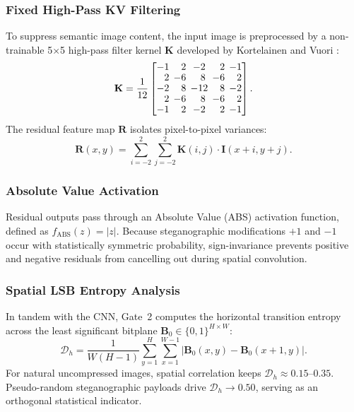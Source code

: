 \documentclass[conference]{IEEEtran}
\begin{document}
\subsubsection{Fixed High-Pass KV Filtering}
To suppress semantic image content, the input image is preprocessed by a non-trainable 5$\times$5 high-pass filter kernel $\mathbf{K}$ developed by Kortelainen and Vuori \cite{xu2016structural}:
\begin{equation}
\begingroup
\renewcommand{\arraystretch}{0.90}
\setlength{\arraycolsep}{2.2pt}
\mathbf{K} = \frac{1}{12} \begin{bmatrix}
-1 & \phantom{-}2 & -2 & \phantom{-}2 & -1 \\
\phantom{-}2 & -6 & \phantom{-}8 & -6 & \phantom{-}2 \\
-2 & \phantom{-}8 & -12 & \phantom{-}8 & -2 \\
\phantom{-}2 & -6 & \phantom{-}8 & -6 & \phantom{-}2 \\
-1 & \phantom{-}2 & -2 & \phantom{-}2 & -1
\end{bmatrix}.
\endgroup
\end{equation}
The residual feature map $\mathbf{R}$ isolates pixel-to-pixel variances:
\begin{equation}
    \mathbf{R}(x, y) = \sum_{i=-2}^{2} \sum_{j=-2}^{2} \mathbf{K}(i, j) \cdot \mathbf{I}(x+i, y+j).
\end{equation}

\subsubsection{Absolute Value Activation}
Residual outputs pass through an Absolute Value (ABS) activation function, defined as $f_{\text{ABS}}(z) = |z|$. Because steganographic modifications $+1$ and $-1$ occur with statistically symmetric probability, sign-invariance prevents positive and negative residuals from cancelling out during spatial convolution.

\subsubsection{Spatial LSB Entropy Analysis}
In tandem with the CNN, Gate~2 computes the horizontal transition entropy across the least significant bitplane $\mathbf{B}_0 \in \{0, 1\}^{H \times W}$:
\begin{equation}
    \mathcal{D}_h = \frac{1}{W(H-1)} \sum_{y=1}^{H} \sum_{x=1}^{W-1} |\mathbf{B}_0(x, y) - \mathbf{B}_0(x+1, y)|.
\end{equation}
For natural uncompressed images, spatial correlation keeps $\mathcal{D}_h \approx 0.15\text{--}0.35$. Pseudo-random steganographic payloads drive $\mathcal{D}_h \to 0.50$, serving as an orthogonal statistical indicator.
\end{document}
